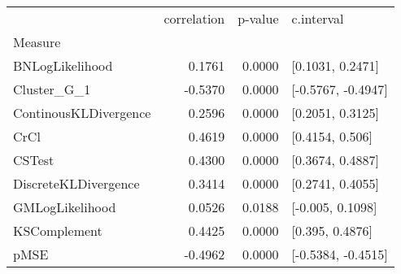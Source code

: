 \begin{tabular}{lrrl}
\toprule
{} &  correlation &  p-value &          c.interval \\
Measure               &              &          &                     \\
\midrule
BNLogLikelihood       &       0.1761 &   0.0000 &    [0.1031, 0.2471] \\
Cluster\_G\_1           &      -0.5370 &   0.0000 &  [-0.5767, -0.4947] \\
ContinousKLDivergence &       0.2596 &   0.0000 &    [0.2051, 0.3125] \\
CrCl                  &       0.4619 &   0.0000 &     [0.4154, 0.506] \\
CSTest                &       0.4300 &   0.0000 &    [0.3674, 0.4887] \\
DiscreteKLDivergence  &       0.3414 &   0.0000 &    [0.2741, 0.4055] \\
GMLogLikelihood       &       0.0526 &   0.0188 &    [-0.005, 0.1098] \\
KSComplement          &       0.4425 &   0.0000 &     [0.395, 0.4876] \\
pMSE                  &      -0.4962 &   0.0000 &  [-0.5384, -0.4515] \\
\bottomrule
\end{tabular}
